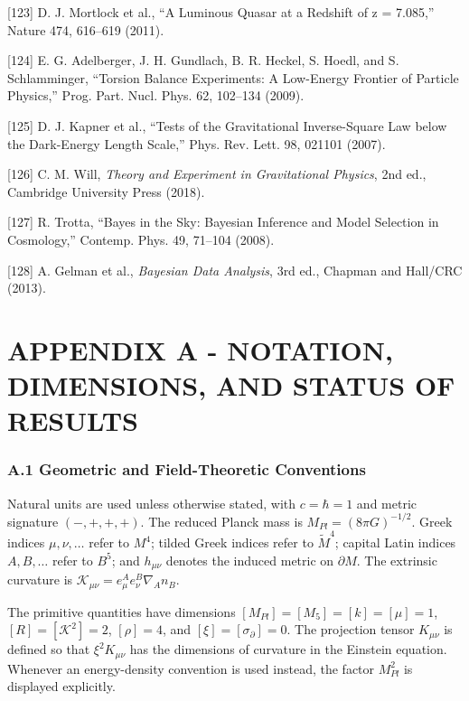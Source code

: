 \documentclass[aps,prd,onecolumn,superscriptaddress,nofootinbib,longbibliography,10pt]{revtex4-2}
\begin{document}
  [123] D. J. Mortlock et al., “A Luminous Quasar at a Redshift of z = 7.085,” Nature 474, 616–619 (2011).


  [124] E. G. Adelberger, J. H. Gundlach, B. R. Heckel, S. Hoedl, and S. Schlamminger, “Torsion Balance Experiments: A Low-Energy Frontier of Particle Physics,” Prog. Part. Nucl. Phys. 62, 102–134 (2009).


  [125] D. J. Kapner et al., “Tests of the Gravitational Inverse-Square Law below the Dark-Energy Length Scale,” Phys. Rev. Lett. 98, 021101 (2007).


  [126] C. M. Will, \textit{Theory and Experiment in Gravitational Physics}, 2nd ed., Cambridge University Press (2018).


  [127] R. Trotta, “Bayes in the Sky: Bayesian Inference and Model Selection in Cosmology,” Contemp. Phys. 49, 71–104 (2008).


  [128] A. Gelman et al., \textit{Bayesian Data Analysis}, 3rd ed., Chapman and Hall/CRC (2013).




 

  
\section*{APPENDIX A - NOTATION, DIMENSIONS, AND STATUS OF RESULTS}

  
\subsubsection*{A.1 Geometric and Field-Theoretic Conventions}

  Natural units are used unless otherwise stated, with \(c = \hbar = 1\) and metric signature \((-,+,+,+)\). The reduced Planck mass is \(M_{Pl} = (8\pi G)^{-1/2}\). Greek indices \(\mu, \nu, \dots\) refer to \(M^4\); tilded Greek indices refer to \(\tilde{M}^4\); capital Latin indices \(A, B, \dots\) refer to \(B^5\); and \(h_{\mu\nu}\) denotes the induced metric on \(\partial M\). The extrinsic curvature is \(\mathcal{K}_{\mu\nu} = e^A_\mu e^B_\nu \nabla_A n_B\).


  The primitive quantities have dimensions \([M_{Pl}] = [M_5] = [k] = [\mu] = 1\), \([R] = [\mathcal{K}^2] = 2\), \([\rho] = 4\), and \([\xi] = [\sigma_\partial] = 0\). The projection tensor \(K_{\mu\nu}\) is defined so that \(\xi^2 K_{\mu\nu}\) has the dimensions of curvature in the Einstein equation. Whenever an energy-density convention is used instead, the factor \(M_{Pl}^2\) is displayed explicitly.
\end{document}
